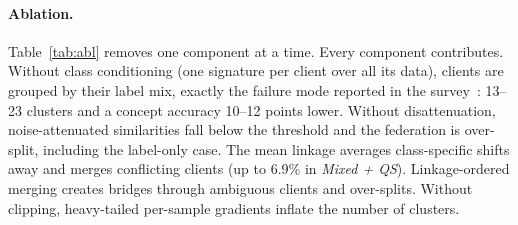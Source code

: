 \paragraph{Ablation.}
Table~\ref{tab:abl} removes one component at a time. Every component contributes. Without class conditioning (one signature per client over all its data), clients are grouped by their label mix, exactly the failure mode reported in the survey~\citep{benali2026survey}: 13--23 clusters and a concept accuracy 10--12 points lower. Without disattenuation, noise-attenuated similarities fall below the threshold and the federation is over-split, including the label-only case. The mean linkage averages class-specific shifts away and merges conflicting clients (up to 6.9\% in \emph{Mixed + QS}). Linkage-ordered merging creates bridges through ambiguous clients and over-splits. Without clipping, heavy-tailed per-sample gradients inflate the number of clusters.
\begin{tableorg}[!htbp]
\centering
\caption{Ablation (Fashion-MNIST, 3 seeds): ARI / number of clusters $K$ per scenario, mean conflict-merge rate and mean concept accuracy over the five scenarios.}\label{tab:abl}
\scriptsize
\setlength{\tabcolsep}{3pt}
\end{tableorg}
